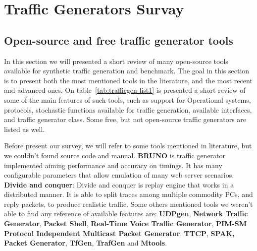 \chapter{Traffic Generators Survay}
\label{ap:traffic-gen-survey}


\section{Open-source and free traffic generator tools}


In this section we will presented a short review of many open-source tools available for synthetic traffic generation and benchmark. The goal in this section is to present both the most mentioned tools in the literature, and the most recent and advanced ones. On table~\ref{tab:trafficgen-list1} is presented a short review of some of the main features of such tools, such as support for Operational systems, protocols, stochastic functions available for traffic generation, available interfaces, and traffic generator class. Some free, but not open-source traffic generators are listed as well. 

Before present our survey, we will refer to some tools mentioned in literature, but we couldn't found source code and manual. \textbf{BRUNO}\cite{bruno-paper} is traffic generator implemented aiming performance and accuracy on timings. It has many configurable parameters that allow emulation of many web server scenarios. \textbf{Divide and conquer}\cite{validate-trafficgen}: Divide and conquer is replay engine that works in a distributed manner. It is able to split traces among multiple commodity PCs, and reply packets, to produce realistic traffic. Some others mentioned tools\cite{web-ditg} we weren't able to find any reference of available features are: \textbf{UDPgen}, \textbf{Network Traffic Generator}, \textbf{Packet Shell}, \textbf{Real-Time Voice Traffic Generator}, \textbf{PIM-SM Protocol Independent Multicast Packet Generator}, \textbf{TTCP}, \textbf{SPAK, Packet Generator}, \textbf{TfGen}, \textbf{TrafGen} and \textbf{Mtools}.





